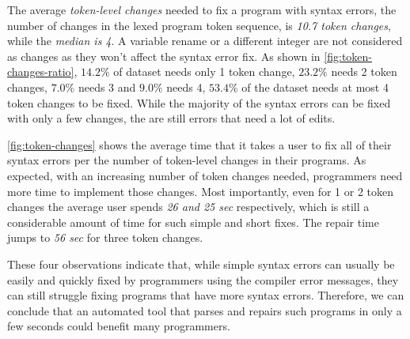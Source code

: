 %
The average \emph{token-level changes} needed to fix a program with syntax
errors, \ie the number of changes in the lexed program token sequence, is
\emph{10.7 token changes}, while the \emph{median is 4}.
%
A variable rename or a different integer are not considered as changes
as they won't affect the syntax error fix.
%
As shown in \autoref{fig:token-changes-ratio}, $14.2\%$ of dataset
needs only 1 token change, $23.2\%$ needs 2 token changes, $7.0\%$
needs 3 and $9.0\%$ needs 4, \ie $53.4\%$ of the dataset needs at
most 4 token changes to be fixed.
%
While the majority of the syntax errors can be fixed with only a few
changes, the are still errors that need a lot of edits.

%
\autoref{fig:token-changes} shows the average time that it takes a user to fix
all of their syntax errors per the number of token-level changes in their
programs. As expected, with an increasing number of token changes needed,
programmers need more time to implement those changes. Most importantly, even
for 1 or 2 token changes the average user spends \emph{26 and 25 sec}
respectively, which is still a considerable amount of time for such simple and
short fixes. The repair time jumps to \emph{56 sec} for three token changes.

\smallskip
These four observations indicate that, while simple syntax errors can usually be
easily and quickly fixed by programmers using the compiler error messages, they
can still struggle fixing programs that have more syntax errors.
%
Therefore, we can conclude that an automated tool that parses and repairs
such programs in only a few seconds could benefit many programmers.
